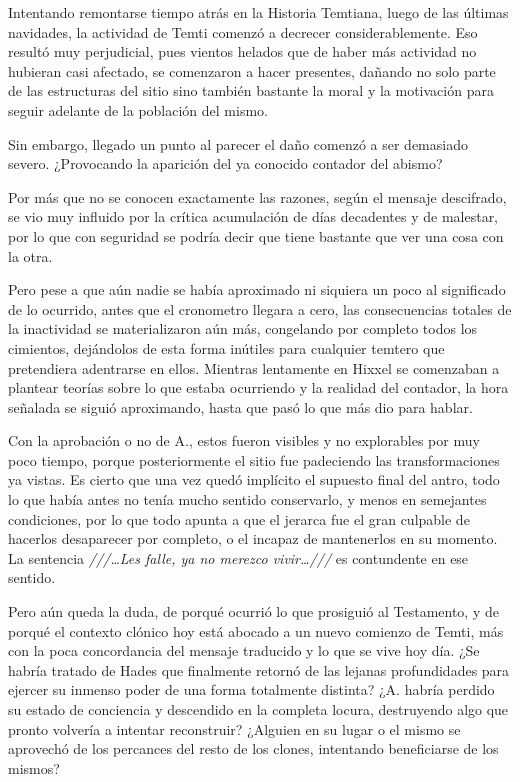 \documentclass[
  spanish,
]{book}
\begin{document}
Intentando remontarse tiempo atrás en la Historia Temtiana, luego de las últimas navidades, la actividad de Temti comenzó a decrecer considerablemente. Eso resultó muy perjudicial, pues vientos helados que de haber más actividad no hubieran casi afectado, se comenzaron a hacer presentes, dañando no solo parte de las estructuras del sitio sino también bastante la moral y la motivación para seguir adelante de la población del mismo.

Sin embargo, llegado un punto al parecer el daño comenzó a ser demasiado severo. ¿Provocando la aparición del ya conocido contador del abismo?

Por más que no se conocen exactamente las razones, según el mensaje descifrado, se vio muy influido por la crítica acumulación de días decadentes y de malestar, por lo que con seguridad se podría decir que tiene bastante que ver una cosa con la otra.

Pero pese a que aún nadie se había aproximado ni siquiera un poco al significado de lo ocurrido, antes que el cronometro llegara a cero, las consecuencias totales de la inactividad se materializaron aún más, congelando por completo todos los cimientos, dejándolos de esta forma inútiles para cualquier temtero que pretendiera adentrarse en ellos. Mientras lentamente en Hixxel se comenzaban a plantear teorías sobre lo que estaba ocurriendo y la realidad del contador, la hora señalada se siguió aproximando, hasta que pasó lo que más dio para hablar.

Con la aprobación o no de A., estos fueron visibles y no explorables por muy poco tiempo, porque posteriormente el sitio fue padeciendo las transformaciones ya vistas. Es cierto que una vez quedó implícito el supuesto final del antro, todo lo que había antes no tenía mucho sentido conservarlo, y menos en semejantes condiciones, por lo que todo apunta a que el jerarca fue el gran culpable de hacerlos desaparecer por completo, o el incapaz de mantenerlos en su momento. La sentencia \emph{///\ldots Les falle, ya no merezco vivir\ldots///} es contundente en ese sentido.

Pero aún queda la duda, de porqué ocurrió lo que prosiguió al Testamento, y de porqué el contexto clónico hoy está abocado a un nuevo comienzo de Temti, más con la poca concordancia del mensaje traducido y lo que se vive hoy día. ¿Se habría tratado de Hades que finalmente retornó de las lejanas profundidades para ejercer su inmenso poder de una forma totalmente distinta? ¿A. habría perdido su estado de conciencia y descendido en la completa locura, destruyendo algo que pronto volvería a intentar reconstruir? ¿Alguien en su lugar o el mismo se aprovechó de los percances del resto de los clones, intentando beneficiarse de los mismos?
\end{document}
